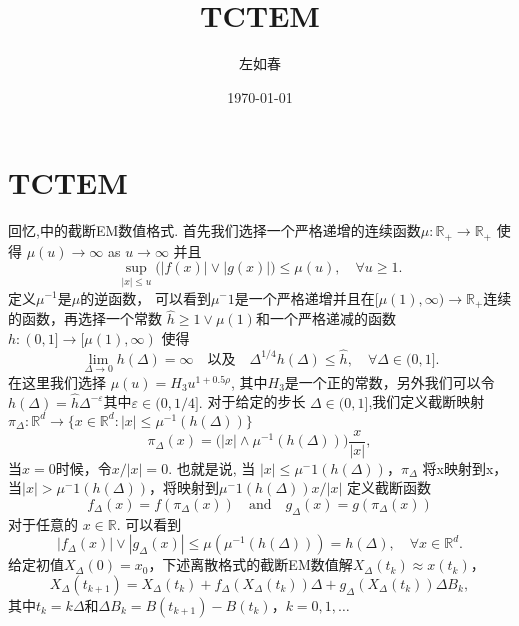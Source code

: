 \documentclass[12pt,final]{article}
\title{TCTEM}
\author{左如春}
\date{\today}
\numberwithin{equation}{section}
\numberwithin{figure}{section}
\numberwithin{table}{section}
\theoremstyle{plain}
\theoremstyle{definition}
\theoremstyle{remark}
\begin{document}
	
	\maketitle
	
	\section{TCTEM}
	回忆\cite{mao2015truncated},\cite{kobayashi2011stochastic}中的截断EM数值格式. 首先我们选择一个严格递增的连续函数$\mu:\mathbb{R}_+\to\mathbb{R}_+$ 使得 $\mu(u)\to\infty$ as $u\to\infty$ 并且
	$$\sup_{|x|\leq u}\bigl(|f(x)|\vee|g(x)|\bigr)\leq\mu(u),\quad\forall u\geq1.$$
	定义$\mu^{-1}$是$\mu$的逆函数， 可以看到$\mu^-1$是一个严格递增并且在[$\mu(1),\infty) \to\mathbb{R}_+$连续的函数，再选择一个常数 $\hat{h}\geq1\vee\mu(1)$和一个严格递减的函数  $h:(0,1]\to[\mu(1),\infty)$ 使得
	$$\lim_{\Delta\to0}h(\Delta)=\infty\quad\mathrm{以及}\quad\Delta^{1/4}h(\Delta)\leq\hat{h},\quad\forall\Delta\in(0,1].$$
	在这里我们选择 $\mu(u)=H_3u^{1+0.5\rho}$, 其中$H_3$是一个正的常数，另外我们可以令 $h(\Delta)=\hat{h}\Delta^{-\varepsilon}$其中$\varepsilon\in(0,1/4].$ 
	对于给定的步长 $\Delta\in(0,1]$,我们定义截断映射 $\pi_{\Delta}:\mathbb{R}^d\to\{x\in\mathbb{R}^d:|x|\leq\mu^{-1}(h(\Delta))\}$ 
	$$\pi_\Delta(x)=\big(|x|\wedge\mu^{-1}(h(\Delta))\big)\frac{x}{|x|},$$
	当$x=0$时候，令$x/|x|=0$. 也就是说, 当 $|x|\leq\mu^-1(h(\Delta))$，$\pi_{\Delta}$ 将x映射到x，当$|x|>\mu^-1(h(\Delta))$，将映射到$\mu^-1(h(\Delta))x/|x|$ 
	定义截断函数
	$$f_\Delta(x)=f(\pi_\Delta(x))\quad\mathrm{and}\quad g_\Delta(x)=g(\pi_\Delta(x))$$
	对于任意的 $x\in\mathbb{R}.$ 可以看到
	$$|f_\Delta(x)|\vee|g_\Delta(x)|\leq\mu(\mu^{-1}(h(\Delta)))=h(\Delta),\quad\forall x\in\mathbb{R}^d.$$
	给定初值$X_{\Delta}(0)=x_{0}$，下述离散格式的截断EM数值解$X_{\Delta}(t_k)\approx x(t_k)$， 
	$$X_\Delta(t_{k+1})=X_\Delta(t_k)+f_\Delta(X_\Delta(t_k))\Delta+g_\Delta(X_\Delta(t_k))\Delta B_k,$$
	其中$t_k=k\Delta$和$\Delta B_k=B(t_{k+1})-B(t_k)$，$k=0,1,\ldots$
	
	
	
	
	
	

\clearpage
{}
{}




	
	
	
	
\end{document}
